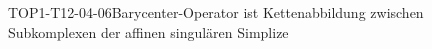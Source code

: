 
\begin{PROP}{TOP1-T12-04-06}{Barycenter-Operator ist Kettenabbildung zwischen Subkomplexen der affinen singulären Simplize}
\end{PROP}
